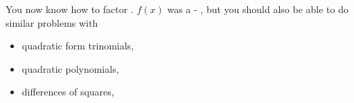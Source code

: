 \vfill 

You now know how to factor . 
$f(x)$ was a -  ,
but you should also be able to do similar problems with  
\begin{itemize}
    \item quadratic form trinomials,
    \item quadratic polynomials,
    \item differences of squares,
\end{itemize}

\vfill{}